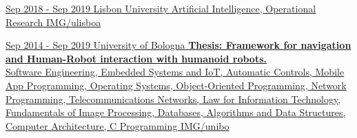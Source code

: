 \documentclass[paper=a4,fontsize=11pt, hidelinks]{temp} %
\begin{document}
\href{https://ciencias.ulisboa.pt/en}{
{Sep 2018 - Sep 2019}
{Lisbon University}
{Artificial Intelligence, Operational Research} 
{IMG/ulisboa}
}
\sepspace

\href{https://corsi.unibo.it/1cycle/ComputerScienceEngineering}{
{Sep 2014 - Sep 2019}
{University of Bologna}
{
    \textbf{Thesis: Framework for navigation and Human-Robot interaction with humanoid robots.}\\
     {%
    Software Engineering, Embedded Systems and IoT, Automatic Controls, Mobile App Programming, Operating Systems, Object-Oriented Programming, Network Programming, Telecommunications Networks, Law for Information Technology, Fundamentals of Image Processing, Databases, Algorithms and Data Structures, Computer Architecture, C Programming
    }
} 
{IMG/unibo}
}
\end{document}

